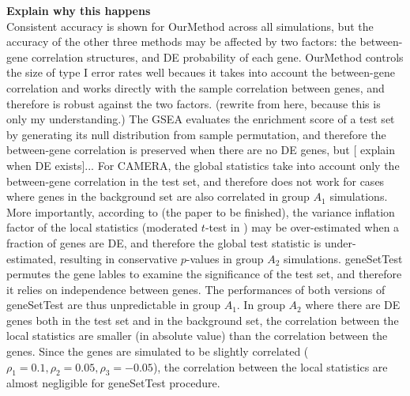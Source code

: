 \documentclass[11pt, a4paper]{article}
\begin{document}
		 
		 \textbf{Explain why this happens}\\
		Consistent accuracy is shown for OurMethod across all simulations, but the accuracy of the other three methods may be affected by two factors: the between-gene correlation structures, and DE probability of each gene. OurMethod controls the size of type I error rates well becaues it takes into account the between-gene correlation and works directly with the sample correlation between genes, and therefore is robust against the two factors. (rewrite from here, because this is only my understanding.)  The GSEA evaluates the enrichment score of a test set by generating its null distribution from sample permutation, and therefore the between-gene correlation is preserved when there are no DE genes, but [ explain when DE exists]... 
		For CAMERA, the global statistics take into account only the between-gene correlation in the test set, and therefore does not work for cases where genes in the background set are also correlated in group $A_1$ simulations. More importantly, according to (the paper to be finished), the variance inflation factor of the local statistics (moderated $t$-test in \cite{wu2012camera}) may be over-estimated when a fraction of genes are DE, and therefore the global test statistic is under-estimated, resulting in conservative $p$-values in group $A_2$ simulations. geneSetTest permutes the gene lables to examine the significance of the test set, and therefore it relies on independence between genes. The performances of both versions of geneSetTest are thus unpredictable in group $A_1$. In group $A_2$ where there are DE genes both in the test set and in the background set, the correlation between the local statistics are smaller (in absolute value) than the correlation between the genes. Since the genes are simulated to be slightly correlated ($\rho_1=0.1, \rho_2 = 0.05, \rho_3 = -0.05$), the correlation between the local statistics are almost negligible for geneSetTest procedure. 
		
		
\end{document}
